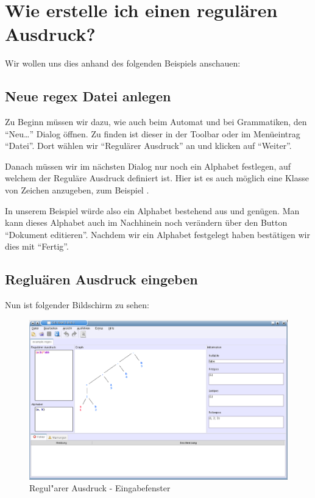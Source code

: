 \chapter{Wie erstelle ich einen regulären Ausdruck?}

Wir wollen uns dies anhand des folgenden Beispiels anschauen: 

\section{Neue regex Datei anlegen}

Zu Beginn müssen wir dazu, wie auch beim Automat und bei Grammatiken, den "`Neu\ldots"' Dialog öffnen. Zu finden ist dieser in der Toolbar oder im Menüeintrag "`Datei"'. Dort wählen wir "`Regulärer Ausdruck"' an und klicken auf "`Weiter"'.\vspace{10pt}

Danach müssen wir im nächsten Dialog nur noch ein Alphabet festlegen, auf welchem der Reguläre Ausdruck definiert ist. Hier ist es auch möglich eine Klasse von Zeichen anzugeben, zum Beispiel \Symbol{[a-z]}.\vspace{10pt}

In unserem Beispiel würde also ein Alphabet bestehend aus  und  genügen. Man kann dieses Alphabet auch im Nachhinein noch verändern über den Button "`Dokument editieren"'. Nachdem wir ein Alphabet festgelegt haben bestätigen wir dies mit "`Fertig"'.\vspace{10pt}

\section{Regluären Ausdruck eingeben}

Nun ist folgender Bildschirm zu sehen:\vspace{10pt}

\begin{figure}[h]
\begin{center}
\includegraphics[width=12cm]{../images/regex_example.png}
\caption{Regul"arer Ausdruck - Eingabefenster}
\end{center}
\end{figure}

